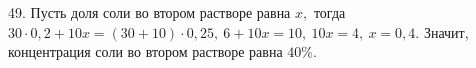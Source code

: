 49. Пусть доля соли во втором растворе равна $x,$ тогда $30\cdot0,2+10x=(30+10)\cdot0,25,\ 6+10x=10,\ 10x=4,\ x=0,4.$ Значит, концентрация соли во втором растворе равна $40\%.$\\
